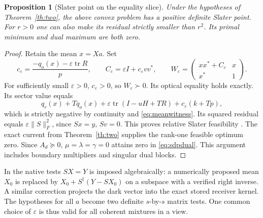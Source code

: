 \documentclass[anonymous,12pt]{iopjournal}
\newtheorem{proposition}[theorem]{Proposition}
\theoremstyle{remark}\newtheorem{remark}[theorem]{Remark}
\newcommand{\tr}{\operatorname{tr}}\newcommand{\diag}{\operatorname{diag}}
\newcommand{\eps}{\varepsilon}\newcommand{\dd}{\mathrm{d}}
\numberwithin{equation}{section}
\begin{document}
\begin{proposition}[Slater point on the equality slice]\label{prop:slater}
Under the hypotheses of Theorem~\ref{th:two}, the above convex problem has a positive definite Slater point. For $r>0$ one can also make its residual strictly smaller than $r^2$. Its primal minimum and dual maximum are both zero.
\end{proposition}
\begin{proof}
Retain the mean $x=Xa$. Set
\[
 c_\eps=\frac{-q_o(x)-\eps\tr R}{p},\qquad
 C_\eps=\eps I+c_\eps vv^*,\qquad
 W_\eps=\begin{pmatrix}xx^*+C_\eps&x\\x^*&1\end{pmatrix}.
\]
For sufficiently small $\eps>0$, $c_\eps>0$, so $W_\eps\succ0$. Its optical equality holds exactly. Its sector value equals
\[
 q_r(x)+Tq_o(x)+\eps\tr(I-uH+TR)+c_\eps(k+Tp),
\]
which is strictly negative by continuity and \eqref{eq:meanwitness}. Its squared residual equals $\eps\|S\|_F^2$, since $Sx=y$, $Sv=0$. This proves relative Slater feasibility \cite{boyd}. The exact current from Theorem~\ref{th:two} supplies the rank-one feasible optimum zero. Since $A_d\succeq0$, $\mu=\lambda=\gamma=0$ attains zero in \eqref{eq:sdpdual}. This argument includes boundary multipliers and singular dual blocks.
\end{proof}
In the native tests $SX=Y$ is imposed algebraically: a numerically proposed mean $X_0$ is replaced by $X_0+S^\dagger(Y-SX_0)$ on a subspace with a verified right inverse. A similar correction projects the dark vector into the exact stored receiver kernel. The hypotheses for all $a$ become two definite $s$-by-$s$ matrix tests. One common choice of $\eps$ is thus valid for all coherent mixtures in a view.
\end{document}
